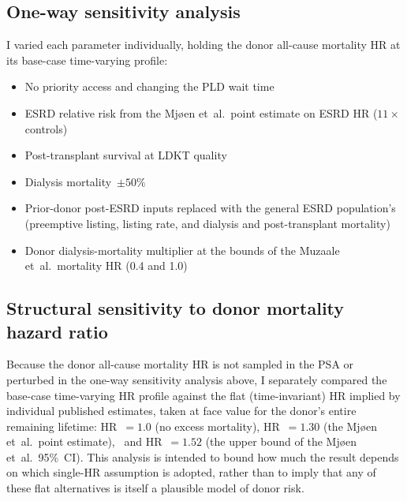 \subsection{One-way sensitivity analysis}
I varied each parameter individually, holding the donor all-cause mortality HR at its base-case time-varying profile:
\begin{itemize}
	\item No priority access and changing the PLD wait time
	\item ESRD relative risk from the Mjøen et~al.\ point estimate on ESRD HR ($11\times$ controls)
	\item Post-transplant survival at LDKT quality
	\item Dialysis mortality~$\pm 50\%$
	\item Prior-donor post-ESRD inputs replaced with the general ESRD population's (preemptive listing, listing rate, and dialysis and post-transplant mortality)
	\item Donor dialysis-mortality multiplier at the bounds of the Muzaale et~al.\ mortality HR (0.4 and 1.0)
\end{itemize}

\subsection{Structural sensitivity to donor mortality hazard ratio}
\label{sec:methods-hr-structural}
Because the donor all-cause mortality HR is not sampled in the PSA or perturbed in the one-way sensitivity analysis above, I separately compared the base-case time-varying HR profile against the flat (time-invariant) HR implied by individual published estimates, taken at face value for the donor's entire remaining lifetime: 
HR~$=1.0$ (no excess mortality), HR~$=1.30$ (the Mjøen et~al.\ point estimate),~\cite{mjoeen_long-term_2014} and HR~$=1.52$ (the upper bound of the Mjøen et~al.\ 95\%~CI). This analysis is intended to bound how much the result depends on which single-HR assumption is adopted, rather than to imply that any of these flat alternatives is itself a plausible model of donor risk.

